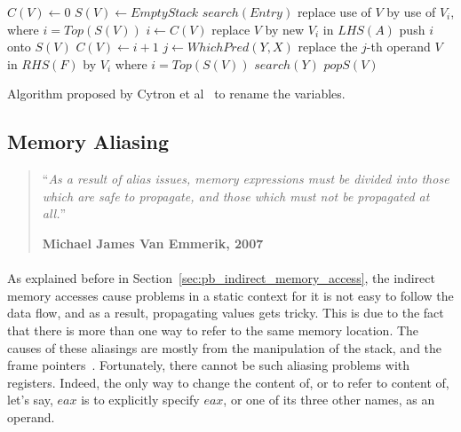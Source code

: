 \begin{algorithm}
	\begin{algorithmic}[1]
			\State $C(V) \leftarrow 0$
			\State $S(V) \leftarrow EmptyStack$
		\EndFor
		\State \MCall $search(Entry)$
		\State
						\State replace use of $V$ by use of $V_i$, where $i = Top(S(V))$
					\EndFor
				\EndIf
					\State $i \leftarrow C(V)$
					\State replace $V$ by new $V_i$ in $LHS(A)$
					\State push $i$ onto $S(V)$
					\State $C(V) \leftarrow i + 1$
				\EndFor
			\EndFor
				\State $j \leftarrow WhichPred(Y, X)$
					\State replace the $j$-th operand $V$ in $RHS(F)$ by $V_i$ where $i = Top(S(V))$
				\EndFor
			\EndFor
				\State \MCall $search(Y)$
			\EndFor
					\State $pop S(V)$
				\EndFor
			\EndFor
		\EndFunction
	\end{algorithmic}
	\caption{Algorithm proposed by Cytron et al~\cite{cytron1991efficiently} to rename the variables.}
	\label{alg:rename}
\end{algorithm}

\subsection{Memory Aliasing} \label{sec:memory_aliasing}
\begin{quotation}
	\noindent ``\emph{As a result of alias issues, memory expressions must be divided into those which are safe to propagate, and those which must not be propagated at all.}''
	\begin{flushright}\textbf{Michael James Van Emmerik, 2007}\end{flushright}
\end{quotation}

\paragraph{}
As explained before in Section~\ref{sec:pb_indirect_memory_access}, the indirect memory accesses cause problems in a static context for it is not easy to follow the data flow, and as a result, propagating values gets tricky. This is due to the fact that there is more than one way to refer to the same memory location. The causes of these aliasings are mostly from the manipulation of the stack, and the frame pointers~\cite{van2007static}. Fortunately, there cannot be such aliasing problems with registers. Indeed, the only way to change the content of, or to refer to content of, let's say, $eax$ is to explicitly specify $eax$, or one of its three other names, as an operand.

